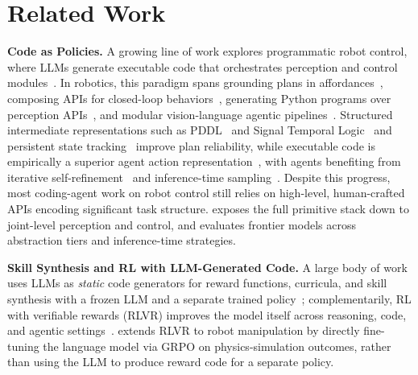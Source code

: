 




















\section{Related Work}
\textbf{Code as Policies.}
A growing line of work explores programmatic robot control, where LLMs generate executable code that orchestrates perception and control modules~\citep{gupta2023visprog, yao2022react}. In robotics, this paradigm spans grounding plans in affordances~\citep{ahn2022saycan}, composing APIs for closed-loop behaviors~\citep{singh2023progprompt, liang2023code}, generating Python programs over perception APIs~\citep{huang2023instruct2act, mu2024robocodex, goldberg2024bloxnet}, and modular vision-language agentic pipelines~\citep{shi2025maestro, huang2022inner, geminirobotics1d52025}. Structured intermediate representations such as PDDL~\citep{aeronautiques1998pddl} and Signal Temporal Logic~\citep{liu2023llmplanning, chen2024autotamp} and persistent state tracking~\citep{yoneda2024statler} improve plan reliability, while executable code is empirically a superior agent action representation~\citep{wang2024codeact}, with agents benefiting from iterative self-refinement~\citep{shinn2023reflexion, madaan2023selfrefine} and inference-time sampling~\citep{wang2023selfconsistency, snell2024scaling}. Despite this progress, most coding-agent work on robot control still relies on high-level, human-crafted APIs encoding significant task structure. \gymname{} exposes the full primitive stack down to joint-level perception and control, and \benchname{} evaluates frontier models across abstraction tiers and inference-time strategies.

\textbf{Skill Synthesis and RL with LLM-Generated Code.}
A large body of work uses LLMs as \emph{static} code generators for reward functions, curricula, and skill synthesis with a frozen LLM and a separate trained policy~\citep{ma2024eureka, yu2023l2r, liang2024eurekaverse, ma2024dreureka, du2023ellm, wang2024robogen, ahn2024autort}; complementarily, RL with verifiable rewards (RLVR) improves the model itself across reasoning, code, and agentic settings~\citep{guo2025deepseek, shao2024deepseekmath, wei2025swerl, pan2024training, feng2026retool}. \rlname{} extends RLVR to robot manipulation by directly fine-tuning the language model via GRPO on physics-simulation outcomes, rather than using the LLM to produce reward code for a separate policy.

